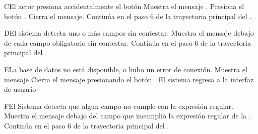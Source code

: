 \begin{UCtrayectoriaA}{C}{El actor presiona accidentalmente el botón }
	\UCpaso Muestra el mensaje .
	\UCpaso[\UCactor] Presiona el botón .
	\UCpaso Cierra el mensaje.
	\UCpaso Continúa en el paso 6 de la trayectoria principal del .
\end{UCtrayectoriaA}
\begin{UCtrayectoriaA}{D}{El sistema detecta uno o más campos sin contestar.}
	\UCpaso Muestra el mensaje  debajo de cada campo obligatorio sin contestar.
	\UCpaso Continúa en el paso 6 de la trayectoria principal del .
\end{UCtrayectoriaA}
\begin{UCtrayectoriaA}{E}{La base de datos no está disponible, o hubo un error de conexión.}
	\UCpaso Muestra el mensaje 
	\UCpaso[\UCactor] Cierra el mensaje presionando el botón .
	\UCpaso El sistema regresa a la interfaz de usuario
\end{UCtrayectoriaA}
\begin{UCtrayectoriaA}{F}{El Sistema detecta que algun campo no cumple con la expresión regular.}
	\UCpaso Muestra el mensaje  debajo del campo que incumplió la expresión regular de la .
	\UCpaso Continúa en el paso 6 de la trayectoria principal del .
\end{UCtrayectoriaA}